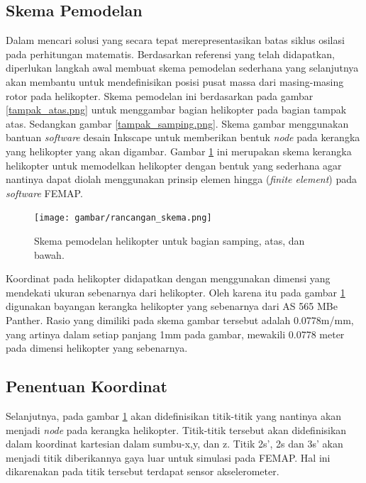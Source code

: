 \subsection{Skema Pemodelan}
Dalam mencari solusi yang secara tepat merepresentasikan batas siklus osilasi pada perhitungan matematis. Berdasarkan referensi yang telah didapatkan, diperlukan langkah awal membuat skema pemodelan sederhana yang selanjutnya akan membantu untuk mendefinisikan posisi pusat massa dari masing-masing rotor pada helikopter. Skema pemodelan ini berdasarkan pada gambar \ref{tampak_atas.png} untuk menggambar bagian helikopter pada bagian tampak atas. Sedangkan gambar \ref{tampak_samping.png}. Skema gambar menggunakan bantuan \textit{software} desain Inkscape untuk memberikan bentuk \textit{node} pada kerangka yang helikopter yang akan digambar. Gambar \ref{fig:skema_model} ini merupakan skema kerangka helikopter untuk memodelkan helikopter dengan bentuk yang sederhana agar nantinya dapat diolah menggunakan prinsip elemen hingga (\textit{finite element}) pada \textit{software} FEMAP.

\begin{figure}[H]
	\centering
	\texttt{[image: gambar/rancangan\_skema.png]}
	\caption{Skema pemodelan helikopter untuk bagian samping, atas, dan bawah.}
	\label{fig:skema_model}
\end{figure}

Koordinat pada helikopter didapatkan dengan menggunakan dimensi yang mendekati ukuran sebenarnya dari helikopter. Oleh karena itu pada gambar \ref{fig:skema_model} digunakan bayangan kerangka helikopter yang sebenarnya dari AS 565 MBe Panther. Rasio yang dimiliki pada skema gambar tersebut adalah 0.0778m/mm, yang artinya dalam setiap panjang 1mm pada gambar, mewakili 0.0778 meter pada dimensi helikopter yang sebenarnya.

\subsection{Penentuan Koordinat}

Selanjutnya, pada gambar \ref{fig:skema_model} akan didefinisikan titik-titik yang nantinya akan menjadi \textit{node} pada kerangka helikopter. Titik-titik tersebut akan didefinisikan dalam koordinat kartesian dalam sumbu-x,y, dan z. Titik 2s', 2s dan 3s' akan menjadi titik diberikannya gaya luar untuk simulasi pada FEMAP. Hal ini dikarenakan pada titik tersebut terdapat sensor akselerometer.



